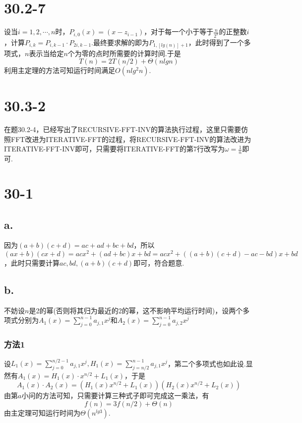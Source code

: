 \documentclass[twocolumn]{article}
\newenvironment{SChinese}{
	\CJKfamily{gbsn}
	\CJKtilde
	\CJKnospace}{}
\begin{document}
\begin{CJK}{UTF8}{}
\begin{SChinese}
			\section*{30.2-7}
				设当$i=1,2,\cdots,n$时，$P_{i,0}(x)=(x-z_{i-1})$，对于每一个小于等于$\frac{n}{2^k}$的正整数$i$，计算$P_{i,k}=P_{i,k-1}\cdot P_{2i,k-1}$.最终要求解的即为$P_{1,[lg(n)]+1}$，此时得到了一个多项式，$n$表示当给定$n$个为零的点时所需要的计算时间.于是\begin{displaymath}
					T(n)=2T(n/2)+\Theta(nlgn)
				\end{displaymath}
				利用主定理的方法可知运行时间满足$O(nlg^2n)$.
			\section*{30.3-2}
				在题30.2-4，已经写出了RECURSIVE-FFT-INV的算法执行过程，这里只需要仿照FFT改进为ITERATIVE-FFT的过程，将RECURSIVE-FFT-INV的算法改进为ITERATIVE-FFT-INV即可，只需要将ITERATIVE-FFT的第7行改写为$\omega=\frac{1}{n}$即可.
			\section*{30-1}
				\subsection*{a.}
					因为$(a+b)(c+d)=ac+ad+bc+bd$，所以$(ax+b)(cx+d)=acx^2+(ad+bc)x+bd=acx^2+((a+b)(c+d)-ac-bd)x+bd$，此时只需要计算$ac,bd,(a+b)(c+d)$即可，符合题意.
				\subsection*{b.}
					不妨设$n$是2的幂(否则将其归为最近的2的幂，这不影响平均运行时间)，设两个多项式分别为$A_1(x)=\sum_{j=0}^{n-1}a_{j,1}x^j$和$A_2(x)=\sum_{j=0}^{n-1}a_{j,2}x^j$\\
					\subsubsection*{方法1}
					设$L_1(x)=\sum_{j=0}^{n/2-1}a_{j,1}x^j,H_1(x)=\sum_{j=n/2}^{n-1}a_{j,1}x^j$，第二个多项式也如此设.显然有$A_1(x)=H_1(x)\cdot x^{n/2}+L_1(x)$，于是\begin{displaymath}
						A_1(x)\cdot A_2(x)=(H_1(x)x^{n/2}+L_1(x))(H_2(x)x^{n/2}+L_2(x))
					\end{displaymath}
					由第$a$小问的方法可知，只需要计算三种式子即可完成这一乘法，有\begin{displaymath}
						f(n)=3f(n/2)+\Theta(n)
					\end{displaymath}
					由主定理可知运行时间为$\Theta(n^{lg3})$.

\end{SChinese}
\end{CJK}
\end{document}
